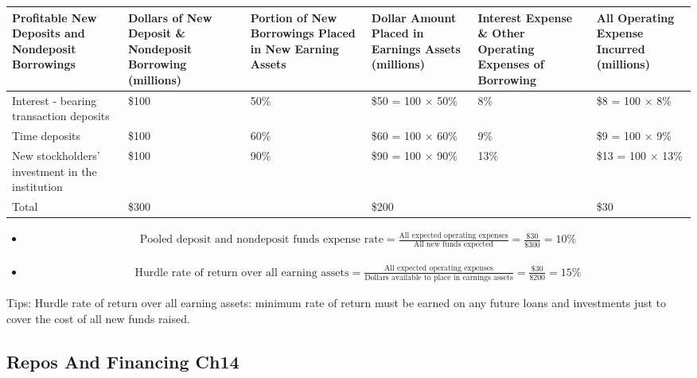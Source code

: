 \begin{itemize}
\begin{itemize}
\begin{itemize}
\begin{table}[h]
        \begin{tabular}{|p{2.5cm}|p{2.5cm}|p{2.5cm}|p{2.5cm}|p{2.5cm}|p{2.5cm}|}
        \hline
        Profitable New Deposits and Nondeposit Borrowings & 
        Dollars of New Deposit \& Nondeposit Borrowing (millions) & 
        Portion of New Borrowings Placed in New Earning Assets & 
        Dollar Amount Placed in Earnings Assets (millions) & 
        Interest Expense \& Other Operating Expenses of Borrowing & 
        All Operating Expense Incurred (millions) \\ \hline
        Interest - bearing transaction deposits & \$100 & 50\% & \$50 = 100 × 50\% & 8\% & \$8 = 100 × 8\% \\ \hline
        Time deposits & \$100 & 60\% & \$60 = 100 × 60\% & 9\% & \$9 = 100 × 9\% \\ \hline
        New stockholders’ investment in the institution & \$100 & 90\% & \$90 = 100 × 90\% & 13\% & \$13 = 100 × 13\% \\ \hline
        Total & \$300 &  & \$200 &  & \$30 \\ \hline
        \end{tabular}
        \end{table}
    \begin{itemize}
        \item 
        \begin{align*}
            \text{Pooled deposit and nondeposit funds expense rate}
            =\frac{\text{All expected operating expenses}}{\text{All new funds expected}}=\frac{\$30}{\$300}=10\%
        \end{align*}
        \item 
        \begin{align*}
            \text{Hurdle rate of return over all earning assets} =\frac{\text{All expected operating expenses}}{\text{Dollars available to place in earnings assets}}=\frac{\$30}{\$200}=15\%
        \end{align*}
        \end{itemize}
        Tips: Hurdle rate of return over all earning assets: minimum rate of return must be earned on any future loans and investments just to cover the cost of all new funds raised.
        

        \end{itemize}
    \end{itemize}
    
\end{itemize}


\subsection{Repos And Financing Ch14}



